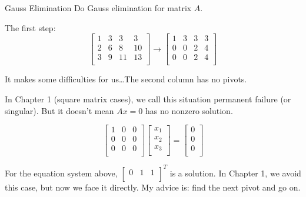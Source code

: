 \documentclass{beamer}
\begin{document}
\begin{frame}{Gauss Elimination}
Do Gauss elimination for matrix $A$.

\vspace{3pt}
The first step:
\begin{equation*}
    \left[ \begin{matrix}
        1&		3&		3&		3\\
        2&		6&		8&		10\\
        3&		9&		11&		13\\
    \end{matrix} \right] \rightarrow \left[ \begin{matrix}
        1&		3&		3&		3\\
        0&		0&		2&		4\\
        0&		0&		2&		4\\
    \end{matrix} \right]
\end{equation*}

It makes some difficulties for us\dots The second column has no pivots.

\vspace{3pt}
In Chapter 1 (square matrix cases), we call this situation permanent failure (or singular). But it doesn't mean $Ax=0$ has no nonzero solution.

\begin{equation*}
    \left[ \begin{matrix}
        1&		0&		0\\
        0&		0&		0\\
        0&		0&		0\\
    \end{matrix} \right] \left[ \begin{array}{c}
        x_1\\
        x_2\\
        x_3\\
    \end{array} \right] =\left[ \begin{array}{c}
        0\\
        0\\
        0\\
    \end{array} \right]
\end{equation*}

For the equation system above, $\left[ \begin{matrix}
	0&		1&		1\\
\end{matrix} \right] ^T$ is a solution. In Chapter 1, we avoid this case, but now we face it directly. My advice is: find the next pivot and go on.
\end{frame}
\end{document}
